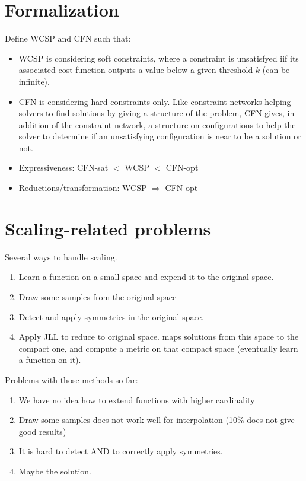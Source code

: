\documentclass[a4paper, 12pt]{article}
\begin{document}
\section{Formalization}
Define WCSP and CFN such that:
\begin{itemize}
\item  WCSP is  considering soft  constraints, where  a constraint  is
  unsatisfyed iif its associated cost function outputs a value below a
  given threshold $k$ (can be infinite).
\item  CFN  is  considering  hard constraints  only.  Like  constraint
  networks helping solvers to find  solutions by giving a structure of
  the problem,  CFN gives,  in addition of  the constraint  network, a
  structure on  configurations to help  the solver to determine  if an
  unsatisfying configuration is near to be a solution or not.
\item Expressiveness: CFN-sat $<$ WCSP $<$ CFN-opt
\item Reductions/transformation: WCSP $\Rightarrow$ CFN-opt
\end{itemize}

\section{Scaling-related problems}
Several ways to handle scaling.
\begin{enumerate}
\item Learn a function on a small  space and expend it to the original
  space.
\item Draw some samples from the original space
\item Detect and apply symmetries in the original space.
\item Apply JLL to reduce to  original space. maps solutions from this
  space to the compact one, and compute a metric on that compact space
  (eventually learn a function on it).
\end{enumerate}

Problems with those methods so far:
\begin{enumerate}
\item We have no idea how to extend functions with higher cardinality
\item Draw  some samples  does not work  well for  interpolation (10\%
  does not give good results)
\item It is hard to detect AND to correctly apply symmetries.
\item Maybe the solution.
\end{enumerate}
\end{document}
